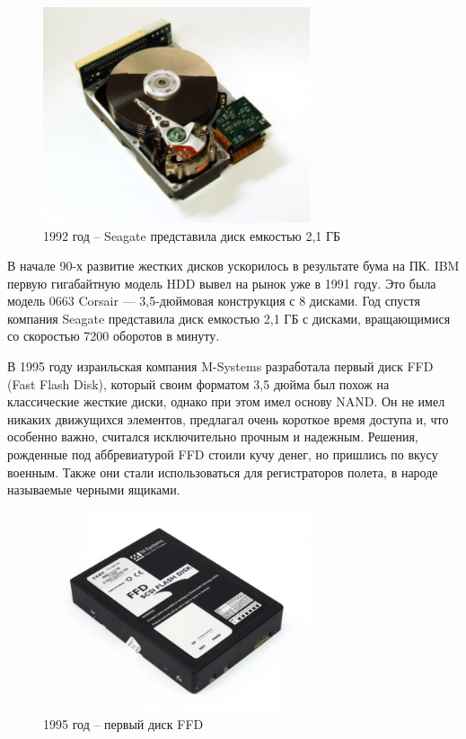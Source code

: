 \documentclass[bachelor, och, referat]{SCWorks}
\begin{document}
\begin{figure}[H]
    \centering
    \includegraphics[width=0.7\textwidth]{seagate1992.png}
    \caption{1992 год -- Seagate представила диск емкостью 2,1 ГБ}
    \label{}
\end{figure}

В начале 90-х развитие жестких дисков ускорилось в результате бума на ПК. IBM 
первую гигабайтную модель HDD вывел на рынок уже в 1991 году. Это была модель 
0663 Corsair — 3,5-дюймовая конструкция с 8 дисками. Год спустя компания 
Seagate представила диск емкостью 2,1 ГБ с дисками, вращающимися со скоростью 
7200 оборотов в минуту.

В 1995 году израильская компания M-Systems разработала первый диск FFD 
(Fast Flash Disk), который своим форматом 3,5 дюйма был похож на классические 
жесткие диски, однако при этом имел основу NAND. Он не имел никаких движущихся 
элементов, предлагал очень короткое время доступа и, что особенно важно, 
считался исключительно прочным и надежным. Решения, рожденные под аббревиатурой 
FFD стоили кучу денег, но пришлись по вкусу военным. Также они стали 
использоваться для регистраторов полета, в народе называемые черными ящиками.

\begin{figure}[H]
    \centering
    \includegraphics[width=0.7\textwidth]{fdd.png}
    \caption{1995 год -- первый диск FFD}
    \label{}
\end{figure}
\end{document}
